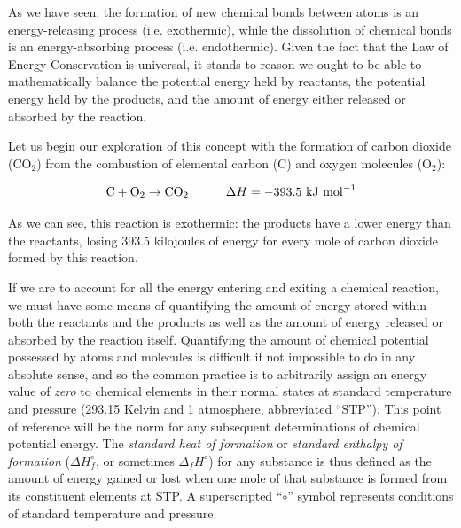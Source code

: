 As we have seen, the formation of new chemical bonds between atoms is an energy-releasing process (i.e. exothermic), while the dissolution of chemical bonds is an energy-absorbing process (i.e. endothermic).  Given the fact that the Law of Energy Conservation is universal, it stands to reason we ought to be able to mathematically balance the potential energy held by reactants, the potential energy held by the products, and the amount of energy either released or absorbed by the reaction.       

Let us begin our exploration of this concept with the formation of carbon dioxide (CO$_{2}$) from the combustion of elemental carbon (C) and oxygen molecules (O$_{2}$):

$$\hbox{C} + \hbox{O}_2 \to \hbox{CO}_2 \hskip 30pt \Delta H = -393.5 \hbox{ kJ mol}^{-1}$$

As we can see, this reaction is exothermic: the products have a lower energy than the reactants, losing 393.5 kilojoules of energy for every mole of carbon dioxide formed by this reaction.

If we are to account for all the energy entering and exiting a chemical reaction, we must have some means of quantifying the amount of energy stored within both the reactants and the products as well as the amount of energy released or absorbed by the reaction itself.  Quantifying the amount of chemical potential possessed by atoms and molecules is difficult if not impossible to do in any absolute sense, and so the common practice is to arbitrarily assign an energy value of \textit{zero} to chemical elements in their normal states at standard temperature and pressure (293.15 Kelvin and 1 atmosphere, abbreviated ``STP'').  This point of reference will be the norm for any subsequent determinations of chemical potential energy.  The \textit{standard heat of formation} or \textit{standard enthalpy of formation} ($\Delta H_f^{\circ}$, or sometimes $\Delta_f H^{\circ}$) for any substance is thus defined as the amount of energy gained or lost when one mole of that substance is formed from its constituent elements at STP.  A superscripted ``$\circ$'' symbol represents conditions of standard temperature and pressure.                  

